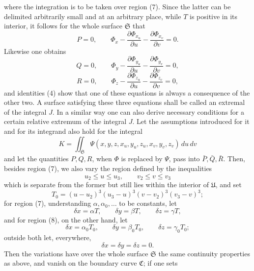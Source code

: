 \documentclass[11pt,a4paper,leqno]{article}
\begin{document}
where the integration is to be taken over region (7). Since the latter
can be delimited arbitrarily small and at an arbitrary place, while $T$
is positive in its interior, it follows for the whole surface $\mathfrak{S}$ that
\[
P=0,\qquad
\Phi_x-\frac{\partial\Phi_{x_u}}{\partial u}
-\frac{\partial\Phi_{x_v}}{\partial v}=0.
\]
Likewise one obtains
\[
Q=0,\qquad
\Phi_y-\frac{\partial\Phi_{y_u}}{\partial u}
-\frac{\partial\Phi_{y_v}}{\partial v}=0,
\]
\[
R=0,\qquad
\Phi_z-\frac{\partial\Phi_{z_u}}{\partial u}
-\frac{\partial\Phi_{z_v}}{\partial v}=0,
\]
and identities (4) show that one of these equations is always a
consequence of the other two. A surface satisfying these three
equations shall be called an extremal of the integral $J$.
In a similar way one can also derive necessary conditions for a
certain relative extremum of the integral $J$.
Let the assumptions introduced for it and for its integrand
also hold for the integral
\[
K=\iint_{\mathfrak{S}}
\Psi(x,y,z,x_u,y_u,z_u,x_v,y_v,z_v)\,du\,dv
\]
and let the quantities $P,Q,R$, when $\Phi$ is replaced by $\Psi$, pass
into $\bar P,\bar Q,\bar R$. Then, besides region (7), we also vary the
region defined by the inequalities
\begin{equation}\tag{8}
u_2\leq u\leq u_3,\qquad v_2\leq v\leq v_3
\end{equation}
which is separate from the former but still lies within the interior
of $\mathfrak{U}$, and set
\[
T_0=(u-u_2)^3(u_3-u)^3(v-v_2)^3(v_3-v)^3;
\]
for region (7), understanding $\alpha,\alpha_0,\ldots$ to be constants, let
\[
\delta x=\alpha T,\qquad \delta y=\beta T,\qquad \delta z=\gamma T,
\]
and for region (8), on the other hand, let
\[
\delta x=\alpha_0T_0,\qquad \delta y=\beta_0T_0,
\qquad \delta z=\gamma_0T_0;
\]
outside both let, everywhere,
\[
\delta x=\delta y=\delta z=0.
\]
Then the variations have over the whole surface $\mathfrak{S}$ the same
continuity properties as above, and vanish on the boundary curve
$\mathfrak{C}$; if one sets
\end{document}
